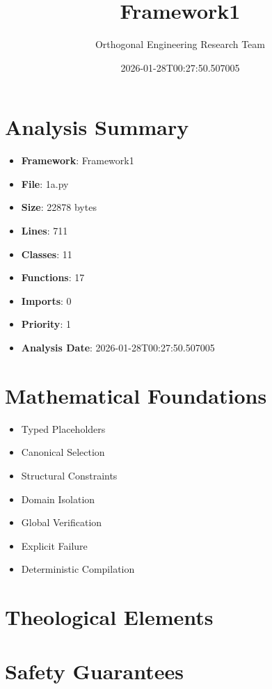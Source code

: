 \documentclass[12pt]{article}
\title{Framework1}
\author{Orthogonal Engineering Research Team}
\date{2026-01-28T00:27:50.507005}
\begin{document}
\maketitle

\section{Analysis Summary}

\begin{itemize}
    \item \textbf{Framework}: Framework1
    \item \textbf{File}: 1a.py
    \item \textbf{Size}: 22878 bytes
    \item \textbf{Lines}: 711
    \item \textbf{Classes}: 11
    \item \textbf{Functions}: 17
    \item \textbf{Imports}: 0
    \item \textbf{Priority}: 1
    \item \textbf{Analysis Date}: 2026-01-28T00:27:50.507005
\end{itemize}

\section{Mathematical Foundations}

\begin{itemize}
    \item Typed Placeholders
    \item Canonical Selection
    \item Structural Constraints
    \item Domain Isolation
    \item Global Verification
    \item Explicit Failure
    \item Deterministic Compilation
\end{itemize}

\section{Theological Elements}

\begin{itemize}
\end{itemize}

\section{Safety Guarantees}
\end{document}
